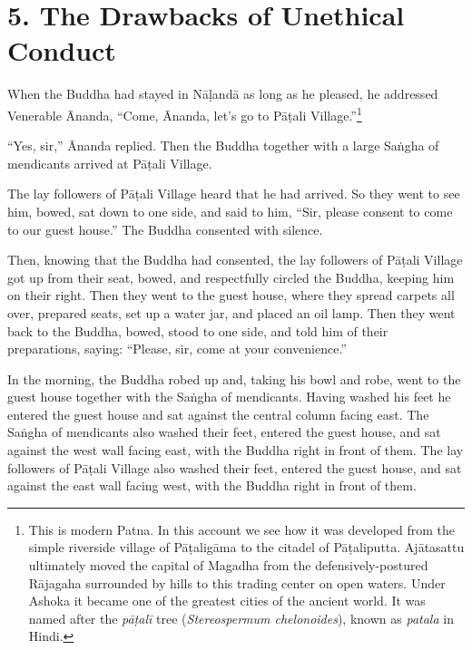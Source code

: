 \documentclass[12pt,openany]{book}%
\begin{document}
\section*{5. The Drawbacks of Unethical Conduct }

When the Buddha had stayed in \textsanskrit{Nāḷandā} as long as he pleased, he addressed Venerable Ānanda, “Come, Ānanda, let’s go to \textsanskrit{Pāṭali} Village.”\footnote{This is modern Patna. In this account we see how it was developed from the simple riverside village of \textsanskrit{Pāṭaligāma} to the citadel of \textsanskrit{Pāṭaliputta}. \textsanskrit{Ajātasattu} ultimately moved the capital of Magadha from the defensively-postured \textsanskrit{Rājagaha} surrounded by hills to this trading center on open waters. Under Ashoka it became one of the greatest cities of the ancient world. It was named after the \textit{\textsanskrit{pāṭalī}} tree (\emph{Stereospermum chelonoides}), known as \emph{patala} in Hindi. } 

“Yes, sir,” Ānanda replied. Then the Buddha together with a large \textsanskrit{Saṅgha} of mendicants arrived at \textsanskrit{Pāṭali} Village. 

The lay followers of \textsanskrit{Pāṭali} Village heard that he had arrived. So they went to see him, bowed, sat down to one side, and said to him, “Sir, please consent to come to our guest house.” The Buddha consented with silence. 

Then, knowing that the Buddha had consented, the lay followers of \textsanskrit{Pāṭali} Village got up from their seat, bowed, and respectfully circled the Buddha, keeping him on their right. Then they went to the guest house, where they spread carpets all over, prepared seats, set up a water jar, and placed an oil lamp. Then they went back to the Buddha, bowed, stood to one side, and told him of their preparations, saying: “Please, sir, come at your convenience.” 

In the morning, the Buddha robed up and, taking his bowl and robe, went to the guest house together with the \textsanskrit{Saṅgha} of mendicants. Having washed his feet he entered the guest house and sat against the central column facing east. The \textsanskrit{Saṅgha} of mendicants also washed their feet, entered the guest house, and sat against the west wall facing east, with the Buddha right in front of them. The lay followers of \textsanskrit{Pāṭali} Village also washed their feet, entered the guest house, and sat against the east wall facing west, with the Buddha right in front of them. 
\end{document}
